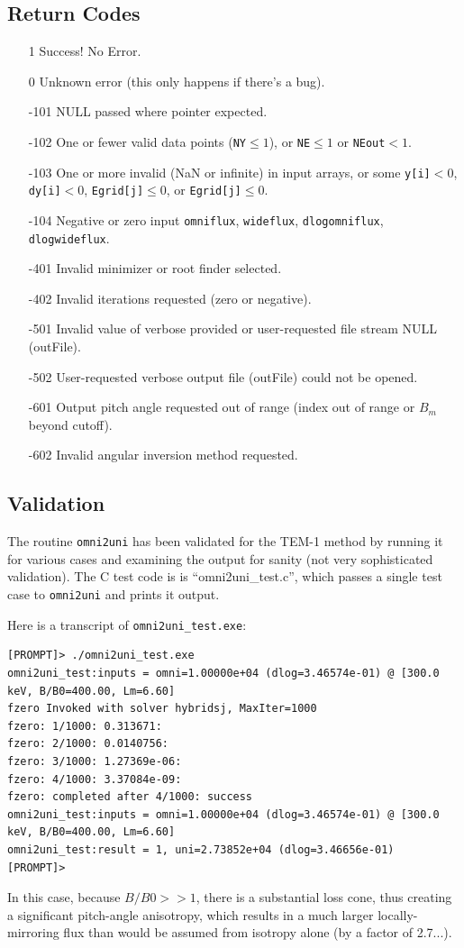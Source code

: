 \documentclass{article}    %
\begin{document}
\subsection{Return Codes}
\label{secTEM1retcodes}
\begin{itemize}
\item[1] Success! No Error.
\item[0] Unknown error (this only happens if there's a bug).
\item[-101] NULL passed where pointer expected.
\item[-102] One or fewer valid data points (\verb|NY|$ \le 1$), or \verb|NE|$\le 1$ or \verb|NEout|$<1$.
\item[-103] One or more invalid (NaN or infinite) in input arrays, or 
  some \verb|y[i]|$<0$, \verb|dy[i]|$<0$, \verb|Egrid[j]|$\le 0$, or \verb|Egrid[j]|$\le 0$.
\item[-104] Negative or zero input \verb|omniflux|, \verb|wideflux|, \verb|dlogomniflux|, \verb|dlogwideflux|.
\item[-401] Invalid minimizer or root finder selected.
\item[-402] Invalid iterations requested (zero or negative).
\item[-501] Invalid value of verbose provided or user-requested file stream NULL (outFile).
\item[-502] User-requested verbose output file (outFile) could not be opened.
\item[-601] Output pitch angle requested out of range (index out of range or $B_m$ beyond cutoff).
\item[-602] Invalid angular inversion method requested.
\end{itemize}

\subsection{Validation}

The routine \verb|omni2uni| has been validated for the TEM-1 method by
running it for various cases and examining the output for sanity (not
very sophisticated validation). The C test code is is
``omni2uni\_test.c'', which passes a single test case to
\verb|omni2uni| and prints it output.

Here is a transcript of \verb|omni2uni_test.exe|:
\begin{verbatim}
[PROMPT]> ./omni2uni_test.exe
omni2uni_test:inputs = omni=1.00000e+04 (dlog=3.46574e-01) @ [300.0 keV, B/B0=400.00, Lm=6.60]
fzero Invoked with solver hybridsj, MaxIter=1000
fzero: 1/1000: 0.313671:
fzero: 2/1000: 0.0140756:
fzero: 3/1000: 1.27369e-06:
fzero: 4/1000: 3.37084e-09:
fzero: completed after 4/1000: success
omni2uni_test:inputs = omni=1.00000e+04 (dlog=3.46574e-01) @ [300.0 keV, B/B0=400.00, Lm=6.60]
omni2uni_test:result = 1, uni=2.73852e+04 (dlog=3.46656e-01)
[PROMPT]> 
\end{verbatim}
In this case, because $B/B0>>1$, there is a substantial loss cone,
thus creating a significant pitch-angle anisotropy, which results in a
much larger locally-mirroring flux than would be assumed from isotropy
alone (by a factor of 2.7...).
\end{document}
